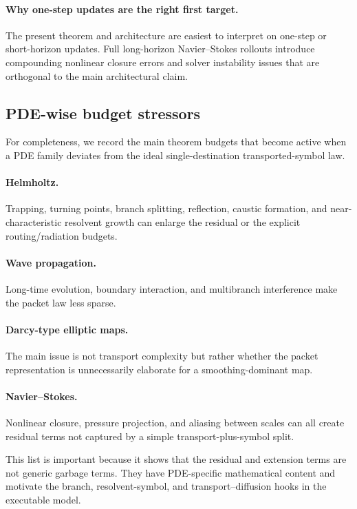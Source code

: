 \paragraph{Why one-step updates are the right first target.}
The present theorem and architecture are easiest to interpret on one-step or short-horizon updates. Full long-horizon Navier--Stokes rollouts introduce compounding nonlinear closure errors and solver instability issues that are orthogonal to the main architectural claim.

\subsection{PDE-wise budget stressors}

For completeness, we record the main theorem budgets that become active when a PDE family deviates from the ideal single-destination transported-symbol law.

\paragraph{Helmholtz.}
Trapping, turning points, branch splitting, reflection, caustic formation, and near-characteristic resolvent growth can enlarge the residual or the explicit routing/radiation budgets.

\paragraph{Wave propagation.}
Long-time evolution, boundary interaction, and multibranch interference make the packet law less sparse.

\paragraph{Darcy-type elliptic maps.}
The main issue is not transport complexity but rather whether the packet representation is unnecessarily elaborate for a smoothing-dominant map.

\paragraph{Navier--Stokes.}
Nonlinear closure, pressure projection, and aliasing between scales can all create residual terms not captured by a simple transport-plus-symbol split.

This list is important because it shows that the residual and extension terms are not generic garbage terms. They have PDE-specific mathematical content and motivate the branch, resolvent-symbol, and transport--diffusion hooks in the executable model.

